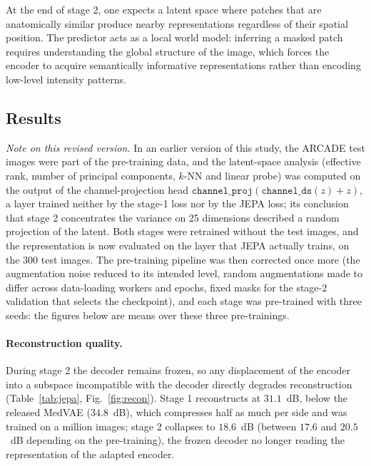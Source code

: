 \documentclass[conference]{IEEEtran}
\begin{document}
At the end of stage 2, one expects a latent space where patches that are anatomically similar produce nearby representations regardless of their spatial position. The predictor acts as a local world model: inferring a masked patch requires understanding the global structure of the image, which forces the encoder to acquire semantically informative representations rather than encoding low-level intensity patterns.

\subsection{Results}

\emph{Note on this revised version.} In an earlier version of this study, the ARCADE test images were part of the pre-training data, and the latent-space analysis (effective rank, number of principal components, $k$-NN and linear probe) was computed on the output of the channel-projection head $\texttt{channel\_proj}(\texttt{channel\_ds}(z)+z)$, a layer trained neither by the stage-1 loss nor by the JEPA loss; its conclusion that stage 2 concentrates the variance on 25 dimensions described a random projection of the latent. Both stages were retrained without the test images, and the representation is now evaluated on the layer that JEPA actually trains, on the 300 test images. The pre-training pipeline was then corrected once more (the augmentation noise reduced to its intended level, random augmentations made to differ across data-loading workers and epochs, fixed masks for the stage-2 validation that selects the checkpoint), and each stage was pre-trained with three seeds: the figures below are means over these three pre-trainings.

\paragraph{Reconstruction quality.}
During stage 2 the decoder remains frozen, so any displacement of the encoder into a subspace incompatible with the decoder directly degrades reconstruction (Table~\ref{tab:jepa}, Fig.~\ref{fig:recon}). Stage 1 reconstructs at $31.1$~dB, below the released MedVAE ($34.8$~dB), which compresses half as much per side and was trained on a million images; stage 2 collapses to $18.6$~dB (between $17.6$ and $20.5$~dB depending on the pre-training), the frozen decoder no longer reading the representation of the adapted encoder.
\end{document}
